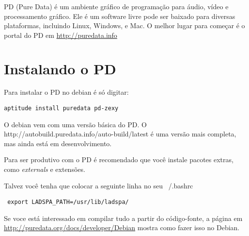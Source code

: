 \documentclass[12pt,brazil]{book}
\begin{document}
PD (Pure Data) é um ambiente gráfico de programação para áudio, vídeo
e processamento gráfico. Ele é um software livre pode ser baixado para
diversas plataformas, incluindo Linux, Windows, e Mac. O melhor lugar
para começar é o portal do PD em \url{http://puredata.info}

\section{Instalando o PD}

Para instalar o PD no debian é só digitar:

\begin{verbatim}
aptitude install puredata pd-zexy
\end{verbatim}

O debian vem com uma versão básica do PD. O
{http://autobuild.puredata.info/auto-build/latest} é uma versão mais
completa, mas ainda está em desenvolvimento.

Para ser produtivo com o PD é recomendado que você instale pacotes
extras, como \textit{externals} e extensões.

Talvez você tenha que colocar a seguinte linha no seu ~/.bashrc

\begin{verbatim}
 export LADSPA_PATH=/usr/lib/ladspa/
\end{verbatim}

Se voce está interessado em compilar tudo a partir do código-fonte, a
página em \url{http://puredata.org/docs/developer/Debian} mostra como
fazer isso no Debian.
\end{document}
